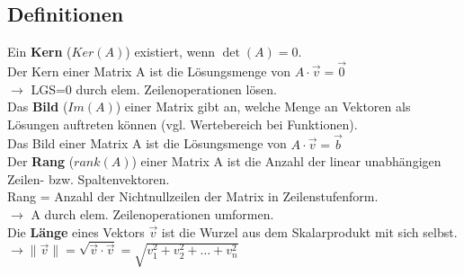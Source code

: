 \subsection{Definitionen}

Ein \textbf{Kern} (\(Ker(A)\)) existiert, wenn \(\det(A) = 0\).\\
Der Kern einer Matrix A ist die Lösungsmenge von \(A \cdot \vec{v} = \vec{0}\)\\
\(\rightarrow\) LGS=0 durch elem. Zeilenoperationen lösen.\\

Das \textbf{Bild} (\(Im(A)\)) einer Matrix gibt an, welche Menge an Vektoren als Lösungen auftreten können (vgl. Wertebereich bei Funktionen).\\
Das Bild einer Matrix A ist die Lösungsmenge von \(A \cdot \vec{v} = \vec{b}\)\\


Der \textbf{Rang} (\(rank(A)\)) einer Matrix A ist die Anzahl der linear unabhängigen Zeilen- bzw. Spaltenvektoren.\\
Rang = Anzahl der Nichtnullzeilen der Matrix in Zeilenstufenform.\\
\(\rightarrow\) A durch elem. Zeilenoperationen umformen.\\

Die \textbf{Länge} eines Vektors \(\vec{v}\) ist die Wurzel aus dem Skalarprodukt mit sich selbst.\\
\(\rightarrow \|\vec{v}\| = \sqrt{\vec{v} \cdot \vec{v}} = \sqrt{v_1^2 + v_2^2 + \dots + v_n^2}\)\\